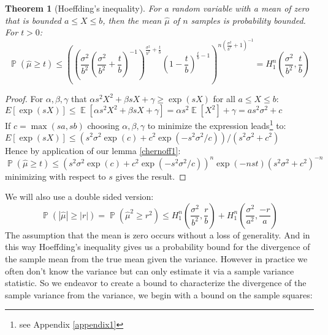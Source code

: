 \documentclass[aap,preprint]{imsart}
\newtheorem{theorem}{Theorem}
\DeclareMathOperator{\E}{\mathbb{E}}
\DeclareMathOperator{\p}{\mathbb{P}}
\begin{document}
\begin{theorem}[Hoeffding's inequality]\label{hoeffdings1}
For a random variable with a mean of zero that is bounded $a\le X\le b$, then the mean $\hat{\mu}$ of $n$ samples is probability bounded. For $t>0$:
\begin{equation}\label{eq_no2} \textstyle\p(\hat{\mu}\ge t)\le 
\left(\left(\frac{\sigma^2}{b^2}(\frac{\sigma^2}{b^2}+\frac{t}{b})^{-1}\right)^{\frac{\sigma^2}{b^2}+\frac{t}{b}}
\left(1-\frac{t}{b}\right)^{\frac{t}{b}-1}\right)^{n(\frac{\sigma^2}{b^2}+1)^{-1}} = H_1^n\left(\frac{\sigma^2}{b^2},\frac{t}{b}\right) \end{equation}
\end{theorem}
\begin{proof}
For $\alpha,\beta,\gamma$ that $\alpha s^2X^2+\beta sX+\gamma\ge \exp(sX)$ for all $a\le X\le b$:\\
$E\left[\exp(sX)\right] \le \E[\alpha s^2X^2+\beta sX+\gamma] = \alpha s^2\E[X^2]+\gamma = as^2\sigma^2+c$\\
If $c=\max(sa,sb)$ choosing $\alpha,\beta,\gamma$ to minimize the expression leads\footnote{see Appendix \ref{appendix1}} to:\\
$E\left[\exp(sX)\right] \le (s^2\sigma^2\exp(c) + c^2\exp(-s^2\sigma^2/c))/(s^2\sigma^2 + c^2) $\\
Hence by application of our lemma \ref{chernoff1}:\\
$ \textstyle\p(\hat{\mu}\ge t)\le \left(s^2\sigma^2\exp(c) + c^2\exp(-s^2\sigma^2/c)\right)^n\exp(-nst)(s^2\sigma^2 + c^2)^{-n} $\\
minimizing with respect to $s$ gives the result.
\end{proof}
We will also use a double sided version:
\begin{equation}\label{eq_no1} \textstyle\p(|\hat{\mu}|\ge |r|)=\p(\hat{\mu}^2\ge r^2)\le H_1^n\left(\frac{\sigma^2}{b^2},\frac{r}{b}\right)+H_1^n\left(\frac{\sigma^2}{a^2},\frac{-r}{a}\right) \end{equation}
The assumption that the mean is zero occurs without a loss of generality.
And in this way Hoeffding's inequality gives us a probability bound for the divergence of the sample mean from the true mean given the variance. However in practice we often don't know the variance but can only estimate it via a sample variance statistic.
So we endeavor to create a bound to characterize the divergence of the sample variance from the variance, we begin with a bound on the sample squares:
\end{document}

